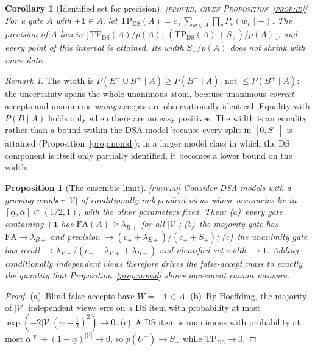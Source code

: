 \documentclass[11pt]{article}
\newtheorem{proposition}{Proposition}
\newtheorem{corollary}{Corollary}
\theoremstyle{definition}
\theoremstyle{remark}
\newtheorem*{remark}{Remark}
\newcommand{\status}[1]{\hfill{\normalfont\small\textsc{[#1]}}}
\newcommand{\cV}{\mathcal{V}}
\newcommand{\one}{\mathbf{1}}
\newcommand{\Up}{U^{+}}
\begin{document}
\begin{corollary}[Identified set for precision]\label{cor:prec}\status{proved, given Proposition~\ref{prop:id}}
For a gate $A$ with $+\one\in A$, let $\mathrm{TP}_{\mathrm{DS}}(A)=c_+\sum_{w\in A}\prod_v P_v(w_v\mid+)$. The precision of $A$ lies in
$\bigl[\,\mathrm{TP}_{\mathrm{DS}}(A)/p(A),\ (\mathrm{TP}_{\mathrm{DS}}(A)+S_+)/p(A)\,\bigr]$, and every point of this interval is attained. Its width $S_+/p(A)$ does not shrink with more data.
\end{corollary}

\begin{remark}
The width is $P(E^+\cup B^+\mid A)\ge P(B^+\mid A)$, not $\le P(B^+\mid A)$: the uncertainty spans the whole unanimous atom, because unanimous \emph{correct} accepts and unanimous \emph{wrong} accepts are observationally identical. Equality with $P(B\mid A)$ holds only when there are no easy positives. The width is an equality rather than a bound within the DSA model because every split in $[0,S_+]$ is attained (Proposition~\ref{prop:nonid}); in a larger model class in which the DS component is itself only partially identified, it becomes a lower bound on the width.
\end{remark}

\begin{proposition}[The ensemble limit]\label{prop:limit}\status{proved}
Consider DSA models with a growing number $|\cV|$ of conditionally independent views whose accuracies lie in $[\underline\alpha,\overline\alpha]\subset(1/2,1)$, with the other parameters fixed. Then:
(a)~every gate containing $+\one$ has $\mathrm{FA}(A)\ge\lambda_{B+}$ for all $|\cV|$;
(b)~the majority gate has $\mathrm{FA}\to\lambda_{B+}$ and precision $\to(c_++\lambda_{E+})/(c_++S_+)$;
(c)~the unanimity gate has recall $\to\lambda_{E+}/(c_++\lambda_{E+}+\lambda_{B-})$ and identified-set width $\to 1$.
Adding conditionally independent views therefore drives the false-accept mass to exactly the quantity that Proposition~\ref{prop:nonid} shows agreement cannot measure.
\end{proposition}
\begin{proof}
(a)~Blind false accepts have $W=+\one\in A$. (b)~By Hoeffding, the majority of $|\cV|$ independent views errs on a DS item with probability at most $\exp(-2|\cV|(\underline\alpha-\tfrac12)^2)\to0$. (c)~A DS item is unanimous with probability at most $\overline\alpha^{|\cV|}+(1-\underline\alpha)^{|\cV|}\to0$, so $p(\Up)\to S_+$ while $\mathrm{TP}_{\mathrm{DS}}\to0$.
\end{proof}
\end{document}
